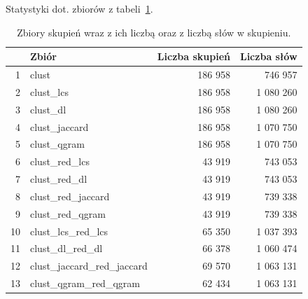 \documentclass{praca1}
\begin{document}
Statystyki dot. zbiorów z tabeli~\ref{tab:005}.

\begin{table}[!h]
\centering
\begin{tabular}{|rl|rr|}
  \hline
 & Zbiór & Liczba skupień & Liczba słów\\ 
  \hline
1 & clust & 186 958 & 746 957 \\ 
  2 & clust\_lcs & 186 958 & 1 080 260 \\ 
  3 & clust\_dl & 186 958 & 1 080 260 \\ 
  4 & clust\_jaccard & 186 958 & 1 070 750 \\ 
  5 & clust\_qgram & 186 958 & 1 070 750 \\ \hline
  6 & clust\_red\_lcs & 43 919 & 743 053 \\ 
  7 & clust\_red\_dl & 43 919 & 743 053 \\ 
  8 & clust\_red\_jaccard & 43 919 & 739 338 \\ 
  9 & clust\_red\_qgram & 43 919 & 739 338 \\ \hline
  10 & clust\_lcs\_red\_lcs & 65 350 & 1 037 393 \\ 
  11 & clust\_dl\_red\_dl & 66 378 & 1 060 474 \\ 
  12 & clust\_jaccard\_red\_jaccard & 69 570 & 1 063 131 \\ 
  13 & clust\_qgram\_red\_qgram & 62 434 & 1 063 131 \\ 
   \hline
\end{tabular}
\caption{Zbiory skupień wraz z ich liczbą oraz z liczbą słów w skupieniu.}
\label{tab:005}
\end{table}






\end{document}
